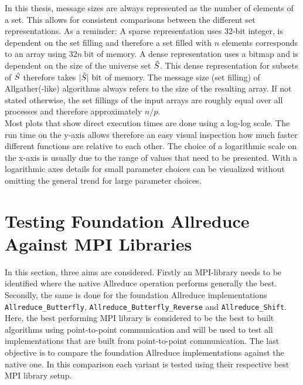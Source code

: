 In this thesis, message sizes are always represented as the number of elements of a set. This allows for consistent comparisons between the different set representations. 
As a reminder: A sparse representation uses 32-bit integer, is dependent on the set filling and therefore a set filled with $n$ elements corresponds to an array using $32n~\text{bit}$ of memory. A dense representation uses a bitmap and is dependent on the size of the universe set $\Tilde{S}$. This dense representation for subsets of $\Tilde{S}$ therefore takes $|\Tilde{S}| ~\text{bit}$ of memory. The message size (set filling) of Allgather(-like) algorithms always refers to the size of the resulting array. If not stated otherwise, the set fillings of the input arrays are roughly equal over all processes and therefore approximately $n/p$.\\
Most plots that show direct execution times are done using a log-log scale. The run time on the y-axis allows therefore an easy visual inspection how much faster different functions are relative to each other. The choice of a logarithmic scale on the x-axis is usually due to the range of values that need to be presented. With a logarithmic axes details for small parameter choices can be visualized without omitting the general trend for large parameter choices.

\section{Testing Foundation Allreduce Against MPI Libraries} \label{sec:baseAllreduce}
In this section, three aims are considered. Firstly an MPI-library needs to be identified where the native Allreduce operation performs generally the best. Secondly, the same is done for the foundation Allreduce implementations \texttt{All\-re\-duce\_But\-ter\-fly}, \texttt{All\-re\-duce\_But\-ter\-fly\_Reverse} and \texttt{All\-re\-duce\-\_Shift}. Here, the best performing MPI library  is considered to be the best to built algorithms using point-to-point communication and will be used to test all implementations that are built from point-to-point communication. The last objective is to compare the foundation Allreduce implementations against the native one. In this comparison each variant is tested using their respective best MPI library setup.

